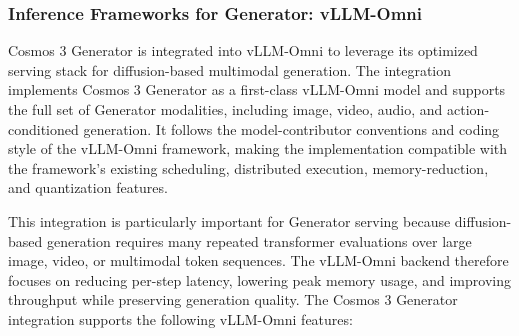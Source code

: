 \subsubsection{Inference Frameworks for Generator: vLLM-Omni}

Cosmos 3 Generator is integrated into vLLM-Omni to leverage its optimized serving stack for diffusion-based multimodal generation. The integration implements Cosmos 3 Generator as a first-class vLLM-Omni model and supports the full set of Generator modalities, including image, video, audio, and action-conditioned generation. It follows the model-contributor conventions and coding style of the vLLM-Omni framework, making the implementation compatible with the framework's existing scheduling, distributed execution, memory-reduction, and quantization features. 

This integration is particularly important for Generator serving because diffusion-based generation requires many repeated transformer evaluations over large image, video, or multimodal token sequences. The vLLM-Omni backend therefore focuses on reducing per-step latency, lowering peak memory usage, and improving throughput while preserving generation quality. The Cosmos 3 Generator integration supports the following vLLM-Omni features:


